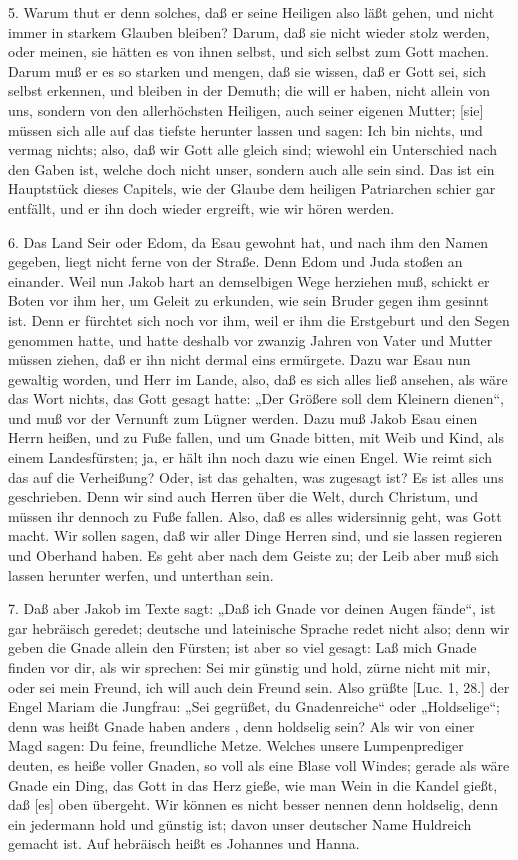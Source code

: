 5. Warum thut er denn solches, daß er seine Heiligen also läßt gehen, und nicht immer in starkem Glauben bleiben? Darum, daß sie nicht wieder stolz werden, oder meinen, sie hätten es von ihnen selbst, und sich selbst zum Gott machen. Darum muß er es so starken und mengen, daß sie wissen, daß er Gott sei, sich selbst erkennen, und bleiben in der Demuth; die will er haben, nicht allein von uns, sondern von den allerhöchsten Heiligen, auch seiner eigenen Mutter; [sie] müssen sich alle auf das tiefste herunter lassen und sagen: Ich bin nichts, und vermag nichts; also, daß wir Gott alle gleich sind; wiewohl ein Unterschied nach den Gaben ist, welche doch nicht unser, sondern auch alle sein sind. Das ist ein Hauptstück dieses Capitels, wie der Glaube dem heiligen Patriarchen schier gar entfällt, und er ihn doch wieder ergreift, wie wir hören werden.

6. Das Land Seir oder Edom, da Esau gewohnt hat, und nach ihm den Namen gegeben, liegt nicht ferne von der Straße. Denn Edom und Juda stoßen an einander. Weil nun Jakob hart an demselbigen Wege herziehen muß, schickt er Boten vor ihm her, um Geleit zu erkunden, wie sein Bruder gegen ihm gesinnt ist. Denn er fürchtet sich noch vor ihm, weil er ihm die Erstgeburt und den Segen genommen hatte, und hatte deshalb vor zwanzig Jahren von Vater und Mutter müssen ziehen, daß er ihn nicht dermal eins ermürgete. Dazu war Esau nun gewaltig worden, und Herr im Lande, also, daß es sich alles ließ ansehen, als wäre das Wort nichts, das Gott gesagt hatte: „Der Größere soll dem Kleinern dienen“, und muß vor der Vernunft zum Lügner werden. Dazu muß Jakob Esau einen Herrn heißen, und zu Fuße fallen, und um Gnade bitten, mit Weib und Kind, als einem Landesfürsten; ja, er hält ihn noch dazu wie einen Engel. Wie reimt sich das auf die Verheißung? Oder, ist das gehalten, was zugesagt ist? Es ist alles uns geschrieben. Denn wir sind auch Herren über die Welt, durch Christum, und müssen ihr dennoch zu Fuße fallen. Also, daß es alles widersinnig geht, was Gott macht. Wir sollen sagen, daß wir aller Dinge Herren sind, und sie lassen regieren und Oberhand haben. Es geht aber nach dem Geiste zu; der Leib aber muß sich lassen herunter werfen, und unterthan sein.

7. Daß aber Jakob im Texte sagt: „Daß ich Gnade vor deinen Augen fände“, ist gar hebräisch geredet; deutsche und lateinische Sprache redet nicht also; denn wir geben die Gnade allein den Fürsten; ist aber so viel gesagt: Laß mich Gnade finden vor dir, als wir sprechen: Sei mir günstig und hold, zürne nicht mit mir, oder sei mein Freund, ich will auch dein Freund sein. Also grüßte [Luc. 1, 28.] der Engel Mariam die Jungfrau: „Sei gegrüßet, du Gnadenreiche“ oder „Holdselige“; denn was heißt Gnade haben anders
, denn holdselig sein? Als wir von einer Magd sagen: Du feine, freundliche Metze. Welches unsere Lumpenprediger deuten, es heiße voller Gnaden, so voll als eine Blase voll Windes; gerade als wäre Gnade ein Ding, das Gott in das Herz gieße, wie man Wein in die Kandel gießt, daß [es] oben übergeht. Wir können es nicht besser nennen denn holdselig, denn ein jedermann hold und günstig ist; davon unser deutscher Name Huldreich gemacht ist. Auf hebräisch heißt es Johannes und Hanna.


